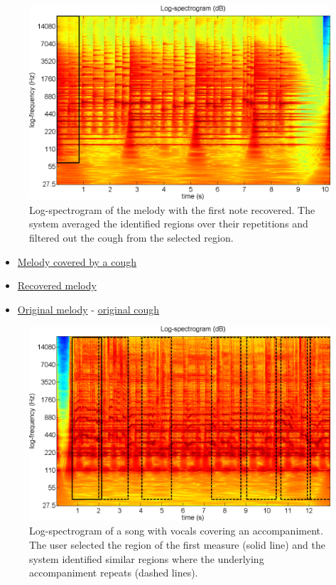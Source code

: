 \documentclass{article}
\begin{document}
\begin{figure}[!htb]
\centering
\includegraphics[width=\columnwidth]{Images/urepet_example1b.png}
\caption{Log-spectrogram of the melody with the first note recovered. The system averaged the identified regions over their repetitions and filtered out the cough from the selected region.}
\label{fig:urepet_example1b}
\end{figure}

\begin{itemize}[noitemsep,topsep=0pt]
\item \href{Audio/uREPET/melody&cough.wav}{Melody covered by a cough}
\item \href{Audio/uREPET/melody-cough.wav}{Recovered melody}
\item \href{Audio/uREPET/melody.wav}{Original melody} - \href{Audio/REPET/cough.wav}{original cough}
\end{itemize}

\begin{figure}[!htb]
\centering
\includegraphics[width=\columnwidth]{Images/urepet_example2a.png}
\caption{Log-spectrogram of a song with vocals covering an accompaniment. The user selected the region of the first measure (solid line) and the system identified similar regions where the underlying accompaniment repeats (dashed lines).}
\label{fig:urepet_example2a}
\end{figure}
\end{document}

